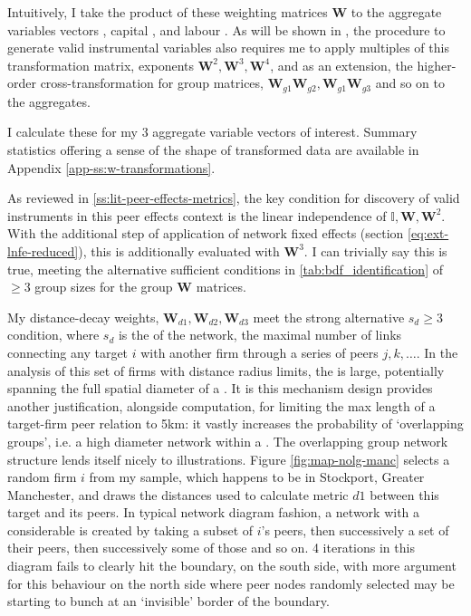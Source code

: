 Intuitively, I take the product of these weighting matrices $\mathbf W$ to the aggregate variables vectors
, capital , and labour .
As will be shown in , the procedure to generate valid instrumental variables
also requires me to apply multiples of this transformation matrix,
exponents $\mathbf W^2, \mathbf W^3, \mathbf W^4$, and as an extension,
the higher-order cross-transformation for group matrices,
$\mathbf W_{g1}\mathbf W_{g2}, \mathbf W_{g1}\mathbf W_{g3}$ and so on to the aggregates.
\par
I calculate these for my 3 aggregate variable vectors of interest.
Summary statistics offering a sense of the shape of transformed data
are available in Appendix \ref{app-ss:w-transformations}.
\par
As reviewed in \ref{ss:lit-peer-effects-metrics}, the key condition
for discovery of valid instruments in this peer effects context is the linear independence of $\mathbb I, \mathbf W, \mathbf W^2$.
With the additional step of application of network fixed effects (section \ref{eq:ext-lnfe-reduced}),
this is additionally evaluated with $\mathbf W^3$.
I can trivially say this is true, meeting the alternative sufficient conditions in \ref{tab:bdf_identification}
of $\geq 3$ group sizes for the group $\mathbf W$ matrices.
\par
My distance-decay weights, $\mathbf W_{d1}, \mathbf W_{d2}, \mathbf W_{d3}$
meet the strong alternative $s_d\geq 3$ condition, where $s_d$ is the  of the network,
the maximal number of links connecting any target $i$ with another firm through a series of peers $j, k, \dots$.
In the analysis of this set of firms with distance radius limits,
the  is large, potentially spanning the full spatial diameter of a .
It is this mechanism design provides another justification, alongside computation,
for limiting the max length of a target-firm peer relation to 5km:
it vastly increases the probability of `overlapping groups', i.e. a high diameter network within a .
The overlapping group network structure lends itself nicely to illustrations.
Figure \ref{fig:map-nolg-manc} selects a random firm $i$ from my sample,
which happens to be in Stockport, Greater Manchester, and draws the distances used to calculate metric $d1$
between this target and its peers. In typical network diagram fashion, a network with a considerable 
is created by taking a subset of $i$'s peers, then successively a set of their peers, then successively some of those
and so on. 4 iterations in this diagram fails to clearly hit the  boundary,
on the south side, with more argument for this behaviour on the north side
where peer nodes randomly selected may be starting to bunch at an `invisible' border of the  boundary.

